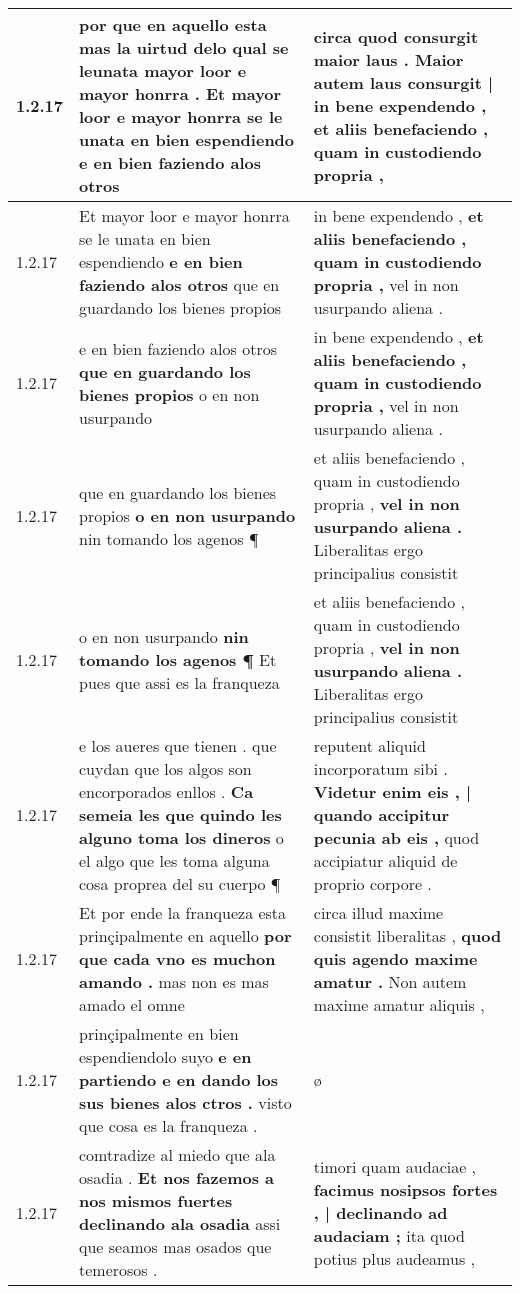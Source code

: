 \begin{tabular}{|p{1cm}|p{6.5cm}|p{6.5cm}|}
1.2.17 & por que en aquello esta mas la uirtud delo qual se leunata mayor loor e mayor honrra . \textbf{ Et mayor loor e mayor honrra se le unata en bien espendiendo } e en bien faziendo alos otros & circa quod consurgit maior laus . \textbf{ Maior autem laus consurgit | in bene expendendo , } et aliis benefaciendo , quam in custodiendo propria , \\\hline
1.2.17 & Et mayor loor e mayor honrra se le unata en bien espendiendo \textbf{ e en bien faziendo alos otros } que en guardando los bienes propios & in bene expendendo , \textbf{ et aliis benefaciendo , quam in custodiendo propria , } vel in non usurpando aliena . \\\hline
1.2.17 & e en bien faziendo alos otros \textbf{ que en guardando los bienes propios } o en non usurpando & in bene expendendo , \textbf{ et aliis benefaciendo , quam in custodiendo propria , } vel in non usurpando aliena . \\\hline
1.2.17 & que en guardando los bienes propios \textbf{ o en non usurpando } nin tomando los agenos ¶ & et aliis benefaciendo , quam in custodiendo propria , \textbf{ vel in non usurpando aliena . } Liberalitas ergo principalius consistit \\\hline
1.2.17 & o en non usurpando \textbf{ nin tomando los agenos ¶ } Et pues que assi es la franqueza & et aliis benefaciendo , quam in custodiendo propria , \textbf{ vel in non usurpando aliena . } Liberalitas ergo principalius consistit \\\hline
1.2.17 & e los aueres que tienen . que cuydan que los algos son encorporados enllos . \textbf{ Ca semeia les que quindo les alguno toma los dineros } o el algo que les toma alguna cosa proprea del su cuerpo ¶ & reputent aliquid incorporatum sibi . \textbf{ Videtur enim eis , | quando accipitur pecunia ab eis , } quod accipiatur aliquid de proprio corpore . \\\hline
1.2.17 & Et por ende la franqueza esta prinçipalmente en aquello \textbf{ por que cada vno es muchon amando . } mas non es mas amado el omne & circa illud maxime consistit liberalitas , \textbf{ quod quis agendo maxime amatur . } Non autem maxime amatur aliquis , \\\hline
1.2.17 & prinçipalmente en bien espendiendolo suyo \textbf{ e en partiendo e en dando los sus bienes alos ctros . } visto que cosa es la franqueza . & ø \\\hline
1.2.17 & comtradize al miedo que ala osadia . \textbf{ Et nos fazemos a nos mismos fuertes declinando ala osadia } assi que seamos mas osados que temerosos . & timori quam audaciae , \textbf{ facimus nosipsos fortes , | declinando ad audaciam ; } ita quod potius plus audeamus , \\\hline

\end{tabular}
